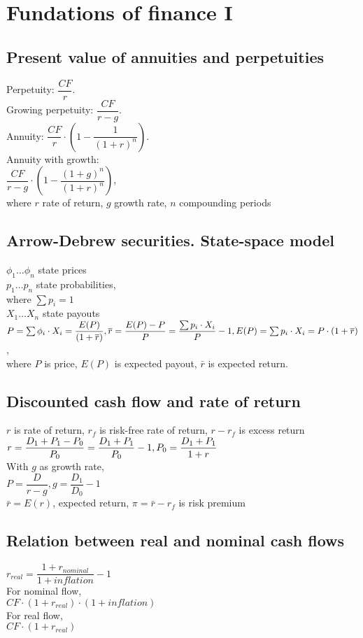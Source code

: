 \section{Fundations of finance I}
\subsection*{Present value of annuities and perpetuities}
Perpetuity: $\dfrac{CF}{r}$. \\ Growing perpetuity: $\dfrac{CF}{r -g}$. \\ Annuity: $\dfrac{CF}{r}\cdot\left(1-\dfrac{1}{(1+r)^n}\right)$. \\ Annuity with growth: \\ $\dfrac{CF}{r-g}\cdot\left(1 - \dfrac{(1+g)^n}{(1+r)^n}\right)$, \\where $r$ rate of return, $g$ growth rate, $n$ compounding periods
\subsection*{Arrow-Debrew securities. State-space model}
$\phi_1\dots\phi_n$ state prices \\
$p_1\dots p_n$ state probabilities, \\ where $\sum p_i = 1$ \\
$X_1\dots X_n$ state payouts \\
$P = \sum\phi_i\cdot X_i  = \dfrac{E(P)}{(1+\bar{r})}, \\ \bar{r} = \dfrac{E(P) - P}{P} = \dfrac{\sum p_i \cdot X_i}{P} - 1, \\ E(P) = \sum p_i \cdot X_i = P\cdot(1+\bar{r})$, \\ where $P$ is price, $E(P)$ is expected payout, $\bar{r}$ is expected return.
\subsection*{Discounted cash flow and rate of return}
$r$ is rate of return, $r_f$ is risk-free rate of return, $r - r_f$ is excess return \\
$ r = \dfrac{D_1 + P_1 - P_0}{P_0} = \dfrac{D_1 + P_1}{P_0} - 1, \\ P_0 = \dfrac{D_1+P_1}{1+r}$ \\
With $g$ as growth rate, \\ $P=\dfrac{D}{r-g}, g=\dfrac{D_1}{D_0} - 1$ \\
$\bar{r}=E(r)$, expected return, $\pi = \bar{r} - r_f$ is risk premium
\subsection*{Relation between real and nominal cash flows}
$r_{real}=\dfrac{1+r_{nominal}}{1+inflation} - 1$ \\
For nominal flow,\\ $CF\cdot(1+r_{real})\cdot(1+inflation)$ \\
For real flow, \\ $CF\cdot(1+r_{real})$
